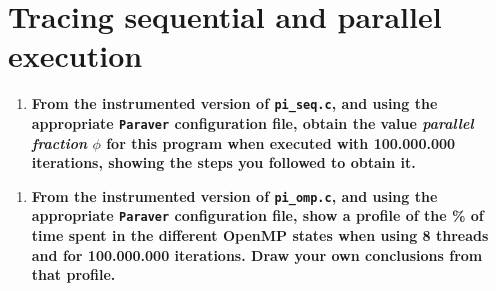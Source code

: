 \documentclass[a4paper]{article}
\begin{document}
\begin{figure}[H]
    \centering
\end{figure}

\section*{Tracing sequential and parallel execution}

\begin{enumerate}[resume]
	\item \textbf{From the instrumented version of \texttt{pi\_seq.c}, and using the appropriate \texttt{Paraver} configuration file, obtain the value \textit{parallel fraction} $\phi$ for this program when executed with 100.000.000 iterations, showing the steps you followed to obtain it.}
\end{enumerate}

\begin{enumerate}[resume]
	\item \textbf{From the instrumented version of \texttt{pi\_omp.c}, and using the appropriate \texttt{Paraver} configuration file, show a profile of the \% of time spent in the different OpenMP states when using 8 threads and for 100.000.000 iterations. Draw your own conclusions from that profile.}
\end{enumerate}
\end{document}
